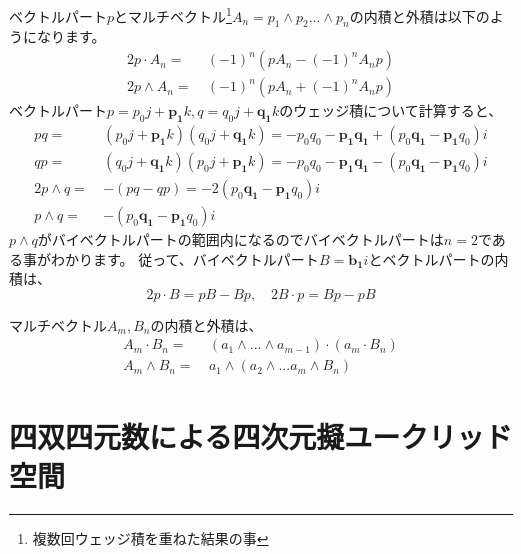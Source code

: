 \documentclass[a4paper,12pt,notitlepage]{jsreport}
\begin{document}
ベクトルパート$p$とマルチベクトル\footnote{複数回ウェッジ積を重ねた結果の事}$A_n=p_1\wedge p_2...\wedge p_n$の内積と外積は以下のようになります。
\begin{equation}
\begin{split}
2p\cdot A_n=~&(-1)^n(pA_n-(-1)^nA_np)\\
2p\wedge A_n=~&(-1)^n(pA_n+(-1)^nA_np)
\end{split}
\end{equation}
ベクトルパート$p=p_0j+\bm{p_1}k,q=q_0j+\bm{q_1}k$のウェッジ積について計算すると、
\begin{equation}
\begin{split}
pq=~&(p_0j+\bm{p_1}k)(q_0j+\bm{q_1}k)=-p_0q_0-\bm{p_1}\bm{q_1}+(p_0\bm{q_1}-\bm{p_1}q_0)i\\
qp=~&(q_0j+\bm{q_1}k)(p_0j+\bm{p_1}k)=-p_0q_0-\bm{p_1}\bm{q_1}-(p_0\bm{q_1}-\bm{p_1}q_0)i\\
2p\wedge q=~&-(pq-qp)=-2(p_0\bm{q_1}-\bm{p_1}q_0)i\\
p\wedge q=~&-(p_0\bm{q_1}-\bm{p_1}q_0)i
\end{split}
\end{equation}
$p\wedge q$がバイベクトルパートの範囲内になるのでバイベクトルパートは$n=2$である事がわかります。
従って、バイベクトルパート$B=\bm{b_1}i$とベクトルパートの内積は、
\begin{equation}
2p\cdot B=pB-Bp,\quad 2B\cdot p=Bp-pB
\end{equation}

マルチベクトル$A_m,B_n$の内積と外積は、
\begin{equation}
\begin{split}
A_m\cdot B_n=~&(a_1\wedge ...\wedge a_{m-1})\cdot(a_m\cdot B_n)\\
A_m\wedge B_n=~&a_1\wedge(a_2\wedge ...a_m\wedge B_n)
\end{split}
\end{equation}

\section{四双四元数による四次元擬ユークリッド空間}
\end{document}
